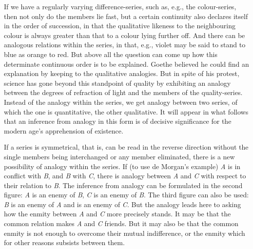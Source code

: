 \documentclass[12pt]{book}
\newcommand{\opage}[1]{\marginnote{\footnotesize\textit{[#1]}}}
\begin{document}
If we have a regularly varying difference-series, such as, e.g., the
colour-series, then not only do the members lie fast, but a certain continuity
also declares itself in the order of succession, in that the qualitative likeness
to the neighbouring colour is always greater than that to a colour lying further
off. And there can be analogous relations within the series, in that, e.g.,
violet may be said to stand to blue as orange to red. But above all the question
can come up how this determinate continuous order is to be explained. Goethe
believed he could find an explanation by keeping to the qualitative analogies.
But in spite of his protest, science has gone beyond this standpoint of quality
by exhibiting an analogy between the degrees of refraction of light and the
members of the quality-series. Instead of the analogy within the series, we get
analogy between two series, of which the one is quantitative, the other
qualitative. It will appear in what follows that an inference from analogy in
this form is of decisive significance for the modern age's apprehension of
existence.

If a series is symmetrical, that is, can be read in the reverse direction without
the single members being interchanged or any member eliminated, there is a new
possibility of analogy within the series. If (to use de Morgan's example)
\textit{A} is in conflict with \textit{B}, and \textit{B} with \textit{C}, there
is analogy between \textit{A} and \textit{C} with respect to their relation to
\textit{B}. The \opage{58}inference from analogy can be formulated in the second figure:
\textit{A} is an enemy of \textit{B}, \textit{C} is an enemy of \textit{B}. The
third figure can also be used: \textit{B} is an enemy of \textit{A} and is an
enemy of \textit{C}. But the analogy leads here to asking how the enmity between
\textit{A} and \textit{C} more precisely stands. It may be that the common
relation makes \textit{A} and \textit{C} friends. But it may also be that the
common enmity is not enough to overcome their mutual indifference, or the enmity
which for other reasons subsists between them.
\end{document}
